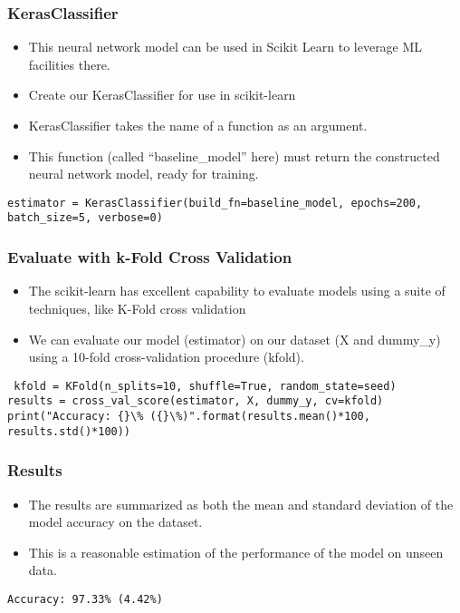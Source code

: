 \begin{frame}[fragile] \frametitle{KerasClassifier}
 \begin{itemize}
 \item  This neural network model can be used in Scikit Learn to leverage ML facilities there.
 \item Create our KerasClassifier for use in scikit-learn
 \item KerasClassifier takes the name of a function as an argument. 
 \item This function (called ``baseline\_model'' here) must return the constructed neural network model, ready for training.
 \end{itemize}
 \begin{lstlisting}
estimator = KerasClassifier(build_fn=baseline_model, epochs=200, batch_size=5, verbose=0)
\end{lstlisting}
\end{frame}

\begin{frame}[fragile] \frametitle{Evaluate with k-Fold Cross Validation}
 \begin{itemize}
 \item  The scikit-learn has excellent capability to evaluate models using a suite of techniques, like K-Fold cross validation
 \item We can evaluate our model (estimator) on our dataset (X and dummy\_y) using a 10-fold cross-validation procedure (kfold).
 \end{itemize}
 \begin{lstlisting}
 kfold = KFold(n_splits=10, shuffle=True, random_state=seed)
results = cross_val_score(estimator, X, dummy_y, cv=kfold)
print("Accuracy: {}\% ({}\%)".format(results.mean()*100, results.std()*100))
\end{lstlisting}
\end{frame}

\begin{frame}[fragile] \frametitle{Results}
 \begin{itemize}
 \item  The results are summarized as both the mean and standard deviation of the model accuracy on the dataset.
 \item  This is a reasonable estimation of the performance of the model on unseen data.
 \end{itemize}
 \begin{lstlisting}
Accuracy: 97.33% (4.42%)
\end{lstlisting}
\end{frame}

